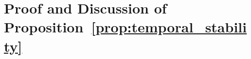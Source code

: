 \documentclass[a4paper,fleqn]{cas-sc}
\begin{document}





\section{}\label{}

\printcredits

%






\newpage
\appendix


\section{Proof and Discussion of Proposition~\ref{prop:temporal_stability}}
\label{app:temporal_stability_proof}
\end{document}
